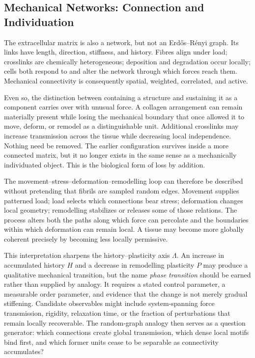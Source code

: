 \documentclass[11pt]{article}
\begin{document}
\subsection{Mechanical Networks: Connection and Individuation}

The extracellular matrix is also a network, but not an Erd\H{o}s--R\'enyi graph. Its links have length, direction, stiffness, and history. Fibres align under load; crosslinks are chemically heterogeneous; deposition and degradation occur locally; cells both respond to and alter the network through which forces reach them. Mechanical connectivity is consequently spatial, weighted, correlated, and active.

Even so, the distinction between containing a structure and sustaining it as a component carries over with unusual force. A collagen arrangement can remain materially present while losing the mechanical boundary that once allowed it to move, deform, or remodel as a distinguishable unit. Additional crosslinks may increase transmission across the tissue while decreasing local independence. Nothing need be removed. The earlier configuration survives inside a more connected matrix, but it no longer exists in the same sense as a mechanically individuated object. This is the biological form of loss by addition.

The movement--stress--deformation--remodelling loop can therefore be described without pretending that fibrils are sampled random edges. Movement supplies patterned load; load selects which connections bear stress; deformation changes local geometry; remodelling stabilizes or releases some of those relations. The process alters both the paths along which force can percolate and the boundaries within which deformation can remain local. A tissue may become more globally coherent precisely by becoming less locally permissive.

This interpretation sharpens the history--plasticity axis $\Lambda$. An increase in accumulated history $H$ and a decrease in remodelling plasticity $P$ may produce a qualitative mechanical transition, but the name \emph{phase transition} should be earned rather than supplied by analogy. It requires a stated control parameter, a measurable order parameter, and evidence that the change is not merely gradual stiffening. Candidate observables might include system-spanning force transmission, rigidity, relaxation time, or the fraction of perturbations that remain locally recoverable. The random-graph analogy then serves as a question generator: which connections create global transmission, which dense local motifs bind first, and which former units cease to be separable as connectivity accumulates?
\end{document}
